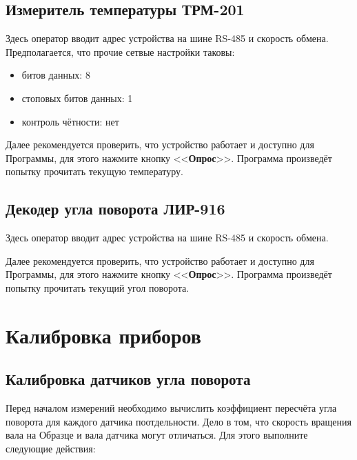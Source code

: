 \documentclass[12pt, a4paper, twocolumn]{book}
\newcommand{\CTL}[1]{<<{\bf #1}>>}
\begin{document}
\subsection{Измеритель температуры ТРМ-201}

Здесь оператор вводит адрес устройства на шине RS-485 и скорость обмена. Предполагается, что прочие сетвые настройки таковы:

\begin{itemize}
\item битов данных: 8
\item стоповых битов данных: 1
\item контроль чётности: нет
\end{itemize}

Далее рекомендуется проверить, что устройство работает и доступно для Программы, для этого нажмите кнопку \CTL{Опрос}. Программа произведёт попытку прочитать текущую температуру.

\subsection{Декодер угла поворота ЛИР-916}

Здесь оператор вводит адрес устройства на шине RS-485 и скорость обмена.

Далее рекомендуется проверить, что устройство работает и доступно для Программы, для этого нажмите кнопку \CTL{Опрос}. Программа произведёт попытку прочитать текущий угол поворота.

\section{Калибровка приборов}

\subsection{Калибровка датчиков угла поворота}

Перед началом измерений необходимо вычислить коэффициент пересчёта угла поворота для каждого датчика поотдельности. Дело в том, что скорость вращения вала на Образце и вала датчика могут отличаться. Для этого выполните следующие действия:
\end{document}
